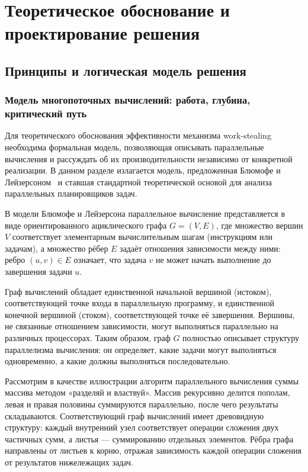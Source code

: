 \section{Теоретическое обоснование и проектирование решения}

\subsection{Принципы и логическая модель решения}

\subsubsection{Модель многопоточных вычислений: работа, глубина,
критический путь}

Для теоретического обоснования эффективности механизма work-stealing
необходима формальная модель, позволяющая описывать параллельные
вычисления и рассуждать об их производительности независимо от
конкретной реализации. В данном разделе излагается модель,
предложенная Блюмофе и Лейзерсоном~\cite{Blumofe1999} и ставшая
стандартной теоретической основой для анализа параллельных
планировщиков задач.

В модели Блюмофе и Лейзерсона параллельное вычисление представляется
в виде ориентированного ациклического графа $G = (V, E)$, где
множество вершин $V$ соответствует элементарным вычислительным
шагам (инструкциям или задачам), а множество рёбер $E$ задаёт
отношения зависимости между ними: ребро $(u, v) \in E$ означает,
что задача $v$ не может начать выполнение до завершения задачи $u$.

Граф вычислений обладает единственной начальной вершиной (истоком),
соответствующей точке входа в параллельную программу, и единственной
конечной вершиной (стоком), соответствующей точке её завершения.
Вершины, не связанные отношением зависимости, могут выполняться
параллельно на различных процессорах. Таким образом, граф $G$
полностью описывает структуру параллелизма вычисления: он определяет,
какие задачи могут выполняться одновременно, а какие должны
выполняться последовательно.

Рассмотрим в качестве иллюстрации алгоритм параллельного вычисления
суммы массива методом «разделяй и властвуй». Массив рекурсивно
делится пополам, левая и правая половины суммируются параллельно,
после чего результаты складываются. Соответствующий граф вычислений
имеет древовидную структуру: каждый внутренний узел соответствует
операции сложения двух частичных сумм, а листья --- суммированию
отдельных элементов. Рёбра графа направлены от листьев к корню,
отражая зависимость каждой операции сложения от результатов
нижележащих задач.

